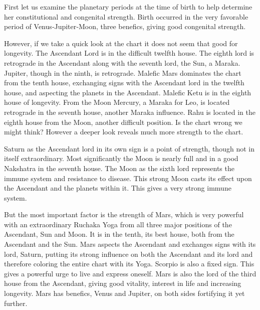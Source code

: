 



 

First let us examine the planetary periods at the time of birth to help determine her constitutional and congenital strength. Birth occurred in the very favorable period of Venus‑Jupiter‑Moon, three benefics, giving good congenital strength.

 

However, if we take a quick look at the chart it does not seem that good for longevity. The Ascendant Lord is in the difficult twelfth house. The eighth lord is retrograde in the Ascendant along with the seventh lord, the Sun, a Maraka. Jupiter, though in the ninth, is retrograde. Malefic Mars dominates the chart from the tenth house, exchanging signs with the Ascendant lord in the twelfth house, and aspecting the planets in the Ascendant. Malefic Ketu is in the eighth house of longevity. From the Moon Mercury, a Maraka for Leo, is located retrograde in the seventh house, another Maraka influence. Rahu is located in the eighth house from the Moon, another difficult position. Is the chart wrong we might think? However a deeper look reveals much more strength to the chart.

 

Saturn as the Ascendant lord in its own sign is a point of strength, though not in itself extraordinary. Most significantly the Moon is nearly full and in a good Nakshatra in the seventh house. The Moon as the sixth lord represents the immune system and resistance to disease. This strong Moon casts its effect upon the Ascendant and the planets within it. This gives a very strong immune system.

 

But the most important factor is the strength of Mars, which is very powerful with an extraordinary Ruchaka Yoga from all three major positions of the Ascendant, Sun and Moon. It is in the tenth, its best house, both from the Ascendant and the Sun. Mars aspects the Ascendant and exchanges signs with its lord, Saturn, putting its strong influence on both the Ascendant and its lord and therefore coloring the entire chart with its Yoga. Scorpio is also a fixed sign. This gives a powerful urge to live and express oneself. Mars is also the lord of the third house from the Ascendant, giving good vitality, interest in life and increasing longevity. Mars has benefics, Venus and Jupiter, on both sides fortifying it yet further.

 

